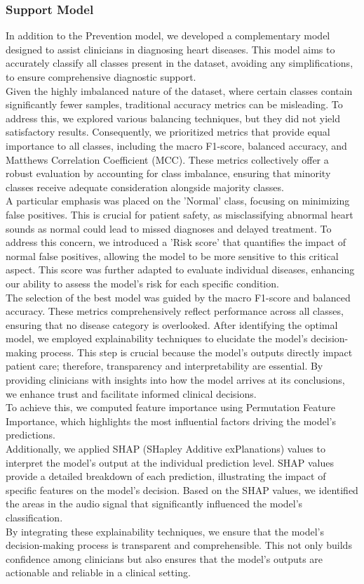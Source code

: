 \subsubsection*{Support Model}

In addition to the Prevention model, we developed a complementary model designed to assist clinicians in diagnosing heart diseases.
This model aims to accurately classify all classes present in the dataset, avoiding any simplifications, to ensure comprehensive diagnostic support.\\
Given the highly imbalanced nature of the dataset, where certain classes contain significantly fewer samples, traditional accuracy metrics can be misleading.
To address this, we explored various balancing techniques, but they did not yield satisfactory results.
Consequently, we prioritized metrics that provide equal importance to all classes, including the macro F1-score, balanced accuracy,
and Matthews Correlation Coefficient (MCC). These metrics collectively offer a robust evaluation by accounting for class imbalance,
ensuring that minority classes receive adequate consideration alongside majority classes.\\
A particular emphasis was placed on the 'Normal' class, focusing on minimizing false positives. This is crucial for patient safety,
as misclassifying abnormal heart sounds as normal could lead to missed diagnoses and delayed treatment.
To address this concern, we introduced a 'Risk score' that quantifies the impact of normal false positives, allowing
the model to be more sensitive to this critical aspect. This score was further adapted to evaluate individual diseases,
enhancing our ability to assess the model's risk for each specific condition.\\
The selection of the best model was guided by the macro F1-score and balanced accuracy.
These metrics comprehensively reflect performance across all classes, ensuring that no disease category is overlooked.
After identifying the optimal model, we employed explainability techniques to elucidate the model’s decision-making process.
 This step is crucial because the model's outputs directly impact patient care; therefore, transparency and interpretability are essential. 
 By providing clinicians with insights into how the model arrives at its conclusions, we enhance trust and facilitate informed clinical decisions.\\
To achieve this, we computed feature importance using Permutation Feature Importance, which highlights the most influential factors driving the model's predictions.\\
Additionally, we applied SHAP (SHapley Additive exPlanations) values to interpret the model's output at the individual prediction level.
 SHAP values provide a detailed breakdown of each prediction, illustrating the impact of specific features on the model's decision. 
 Based on the SHAP values, we identified the areas in the audio signal that significantly influenced the model's classification.\\
By integrating these explainability techniques, we ensure that the model’s decision-making process is transparent and comprehensible. 
This not only builds confidence among clinicians but also ensures that the model's outputs are actionable and reliable in a clinical setting.